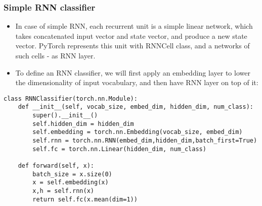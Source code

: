 \begin{frame}[fragile] \frametitle{Simple RNN classifier}


\begin{itemize}
\item In case of simple RNN, each recurrent unit is a simple linear network, which takes concatenated input vector and state vector, and produce a new state vector. PyTorch represents this unit with RNNCell class, and a networks of such cells - as RNN layer.
\item 
To define an RNN classifier, we will first apply an embedding layer to lower the dimensionality of input vocabulary, and then have RNN layer on top of it:
\end{itemize}

\begin{lstlisting}
class RNNClassifier(torch.nn.Module):
    def __init__(self, vocab_size, embed_dim, hidden_dim, num_class):
        super().__init__()
        self.hidden_dim = hidden_dim
        self.embedding = torch.nn.Embedding(vocab_size, embed_dim)
        self.rnn = torch.nn.RNN(embed_dim,hidden_dim,batch_first=True)
        self.fc = torch.nn.Linear(hidden_dim, num_class)

    def forward(self, x):
        batch_size = x.size(0)
        x = self.embedding(x)
        x,h = self.rnn(x)
        return self.fc(x.mean(dim=1))
\end{lstlisting}



\end{frame}

